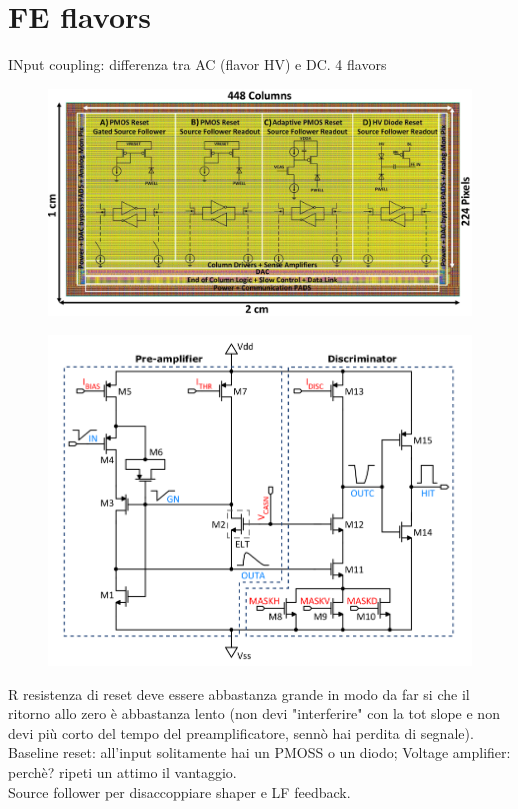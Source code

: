 \section{FE flavors}
    INput coupling: differenza tra AC (flavor HV) e DC. 4 flavors\\
    \begin{figure}[h!]
        \centering
        \includegraphics[width=.7\linewidth]{figures/Monopix1/Monopix1_flavors.png}
        \caption{}
        \label{fig:Monopix1_flavors}
    \end{figure}


    \begin{figure}[h!]
        \centering
        \includegraphics[width=.7\linewidth]{figures/Monopix1/Monopix1_FE_circuit.png}
        \caption{}
        \label{fig:Monopix1_FE_circuit}
    \end{figure}

        R resistenza di reset deve essere abbastanza grande in modo da far si che il
    ritorno allo zero è abbastanza lento (non devi "interferire" con la tot slope
    e non devi più corto del tempo del preamplificatore, sennò hai perdita di segnale).\\
    Baseline reset: all'input solitamente hai un PMOSS o un diodo;  
    Voltage amplifier: perchè? ripeti un attimo il vantaggio. \\
    Source follower per disaccoppiare shaper e LF feedback.\\


